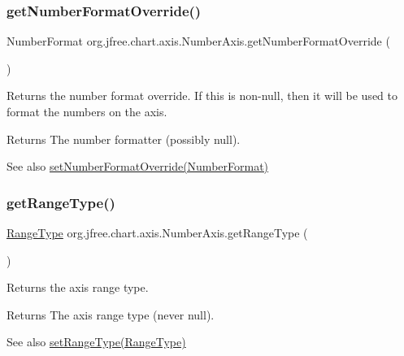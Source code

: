 \subsubsection{\texorpdfstring{get\+Number\+Format\+Override()}{getNumberFormatOverride()}}
{\footnotesize\ttfamily Number\+Format org.\+jfree.\+chart.\+axis.\+Number\+Axis.\+get\+Number\+Format\+Override (\begin{DoxyParamCaption}{ }\end{DoxyParamCaption})}

Returns the number format override. If this is non-\/null, then it will be used to format the numbers on the axis.

\begin{DoxyReturn}{Returns}
The number formatter (possibly {\ttfamily null}).
\end{DoxyReturn}
\begin{DoxySeeAlso}{See also}
\mbox{\hyperlink{classorg_1_1jfree_1_1chart_1_1axis_1_1_number_axis_aa30f98a9e8ab585366f8cbe3bf4f6edf}{set\+Number\+Format\+Override(\+Number\+Format)}} 
\end{DoxySeeAlso}
\mbox{\label{classorg_1_1jfree_1_1chart_1_1axis_1_1_number_axis_a94094757ebaf3ace59f591e033da1144}} 
\subsubsection{\texorpdfstring{get\+Range\+Type()}{getRangeType()}}
{\footnotesize\ttfamily \mbox{\hyperlink{classorg_1_1jfree_1_1data_1_1_range_type}{Range\+Type}} org.\+jfree.\+chart.\+axis.\+Number\+Axis.\+get\+Range\+Type (\begin{DoxyParamCaption}{ }\end{DoxyParamCaption})}

Returns the axis range type.

\begin{DoxyReturn}{Returns}
The axis range type (never {\ttfamily null}).
\end{DoxyReturn}
\begin{DoxySeeAlso}{See also}
\mbox{\hyperlink{classorg_1_1jfree_1_1chart_1_1axis_1_1_number_axis_a6636f7ceef2cafa5230d718b195e96d1}{set\+Range\+Type(\+Range\+Type)}} 
\end{DoxySeeAlso}
\mbox{\label{classorg_1_1jfree_1_1chart_1_1axis_1_1_number_axis_a17a75a59f3d3b8eff0d53c717bfb3b13}} 
